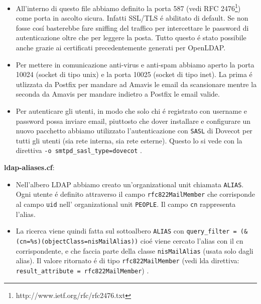\documentclass[9pt, a4paper, oneside]{article}
\begin{document}
				\begin{itemize}
					\item
						All'interno di questo file 
						abbiamo definito la porta 587 
						(vedi RFC 
						2476\footnote{http://www.ietf.org/rfc/rfc2476.txt})
						come porta in ascolto sicura. 
						Infatti SSL/TLS \'e abilitato 
						di default. Se non fosse cos\'i 
						basterebbe fare sniffing del 
						traffico per intercettare le 
						password di autenticazione 
						oltre che per leggere la 
						posta. Tutto questo \'e stato 
						possibile anche grazie ai 
						certificati precedentemente 
						generati per OpenLDAP.
					\item
						Per mettere in comunicazione 
						anti-virus e anti-spam abbiamo 
						aperto la porta 10024 (socket 
						di tipo unix) e la porta 10025 
						(socket di tipo inet). La prima 
						\'e utlizzata da Postfix per 
						mandare ad Amavis le email da 
						scansionare mentre la seconda 
						da Amavis per mandare indietro 
						a Postfix le email valide.
					\item
						Per autenticare gli utenti, in 
						modo che solo chi \'e 
						registrato con username e 
						password possa inviare email,
						piuttosto che dover installare 
						e configurare un nuovo 
						pacchetto abbiamo utilizzato 
						l'autenticazione con 
						\texttt{SASL} di Dovecot per 
						tutti gli utenti (sia rete 
						interna, sia rete esterne).
						Questo lo si vede con la 
						direttiva 
						\texttt{-o smtpd\_sasl\_type=dovecot}
						.
				\end{itemize}
			\par
				\textbf{ldap-aliases.cf}:
				\begin{itemize}
					\item
						Nell'albero LDAP abbiamo creato 
						un'organizational unit chiamata 
						\texttt{ALIAS}. Ogni utente \'e 
						definito attraverso il campo 
						\texttt{rfc822MailMember} che 
						corrisponde al campo 
						\texttt{uid} nell' 
						organizational unit 
						\texttt{PEOPLE}. Il campo 
						\texttt{cn} rappresenta 
						l'alias.
					\item
						La ricerca viene quindi fatta 
						sul sottoalbero \texttt{ALIAS} 
						con \newline
						\texttt{query\_filter = (\&(cn=\%s)(objectClass=nisMailAlias))}
						cio\'e viene cercato l'alias 
						con il cn corrispondente, e che 
						faccia parte della classe 
						\texttt{nisMailAlias} (usata 
						solo dagli alias). Il valore 
						ritornato \'e di tipo 
						\texttt{rfc822MailMember} 
						(vedi lda direttiva: 
						\texttt{result\_attribute = rfc822MailMember})
						.
				\end{itemize}
\end{document}
